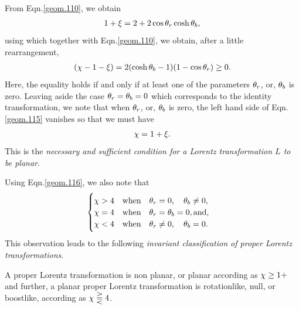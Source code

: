 {From Eqn.\eqref{geom.110}, we obtain
\begin{align}\label{geom.114}
1+{\xi}= 2+2\cos{\theta}_r\cosh{\theta}_b,
\end{align}
using which together with Eqn.\eqref{geom.110}, we 
obtain, after a little rearrangement,
\begin{align}\label{geom.115}
({\chi}-1-{\xi})= 2(\cosh{\theta}_b-1)(1-\cos{\theta}_r)\geq 0.
\end{align}
Here, the equality holds if and only if at least one 
of 
the parameters ${\theta}_r$, or, ${\theta}_b$ is zero. Leaving 
aside the case ${\theta}_r={\theta}_b=0$ which corresponds to 
the identity transformation, we note  that when 
${\theta}_r$, or, ${\theta}_b$ is zero, the left hand side of 
Eqn.\eqref{geom.115} vanishes  so that we must have
\begin{align}\label{geom.116}
{\chi}=1+{\xi}.
\end{align}
This is the \textsl{necessary and sufficient condition 
for a Lorentz  transformation $L$ to be planar}.


Using Eqn.\eqref{geom.116}, we also note that
\begin{align}\label{geom.117}
\begin{cases}
{\chi}>4\quad \text{when}\quad {\theta}_r=0, \quad{\theta}_b\neq 
0,\\
{\chi}=4\quad  \text{when} \quad  {\theta}_r={\theta}_b=0, 
\text{and,} \\
{\chi}<4\quad  \text{when} \quad  {\theta}_r\neq 0,\quad
{\theta}_b=0. 
\end{cases}
\end{align}
This observation leads to the following 
\textsl{invariant classification of proper Lorentz 
transformations}.

\Lem A proper Lorentz transformation is  non planar, or 
planar according as ${\chi}\geq 1+$ and further, a planar 
proper Lorentz transformation is {rotationlike, null, 
or boostlike,} according as ${\chi}\gtreqqless 4$.

}
